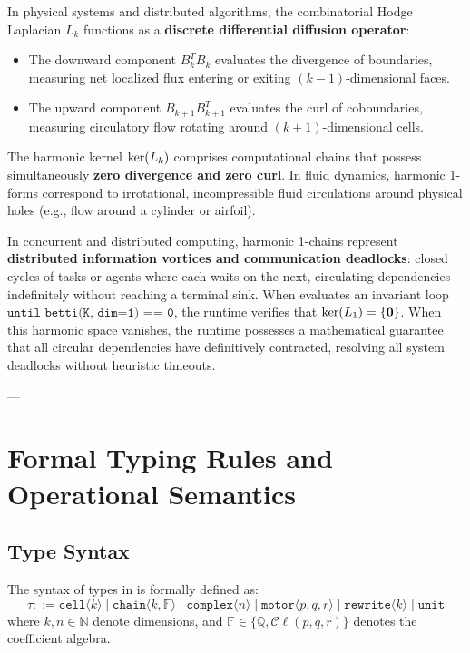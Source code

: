 \begin{remark}
In physical systems and distributed algorithms, the combinatorial Hodge Laplacian $L_k$ functions as a \textbf{discrete differential diffusion operator}:
\begin{itemize}[leftmargin=1.2cm]
    \item The downward component $B_k^T B_k$ evaluates the divergence of boundaries, measuring net localized flux entering or exiting $(k-1)$-dimensional faces.
    \item The upward component $B_{k+1} B_{k+1}^T$ evaluates the curl of coboundaries, measuring circulatory flow rotating around $(k+1)$-dimensional cells.
\end{itemize}
The harmonic kernel $\operatorname{ker}(L_k)$ comprises computational chains that possess simultaneously \textbf{zero divergence and zero curl}. In fluid dynamics, harmonic 1-forms correspond to irrotational, incompressible fluid circulations around physical holes (e.g., flow around a cylinder or airfoil).

In concurrent and distributed computing, harmonic 1-chains represent \textbf{distributed information vortices and communication deadlocks}: closed cycles of tasks or agents where each waits on the next, circulating dependencies indefinitely without reaching a terminal sink. When \ToposLang{} evaluates an invariant loop $\texttt{until betti(K, dim=1) == 0}$, the runtime verifies that $\operatorname{ker}(L_1) = \{\mathbf{0}\}$. When this harmonic space vanishes, the runtime possesses a mathematical guarantee that all circular dependencies have definitively contracted, resolving all system deadlocks without heuristic timeouts.
\end{remark}

---

\section{Formal Typing Rules and Operational Semantics}
\label{sec:type_system_formal}

\subsection{Type Syntax}
The syntax of types in \ToposLang{} is formally defined as:
\begin{equation}
    \tau ::= \texttt{cell}\langle k \rangle \mid \texttt{chain}\langle k, \mathbb{F} \rangle \mid \texttt{complex}\langle n \rangle \mid \texttt{motor}\langle p,q,r \rangle \mid \texttt{rewrite}\langle k \rangle \mid \texttt{unit}
\end{equation}
where $k, n \in \mathbb{N}$ denote dimensions, and $\mathbb{F} \in \{ \mathbb{Q}, \mathcal{C}\ell(p,q,r) \}$ denotes the coefficient algebra.

